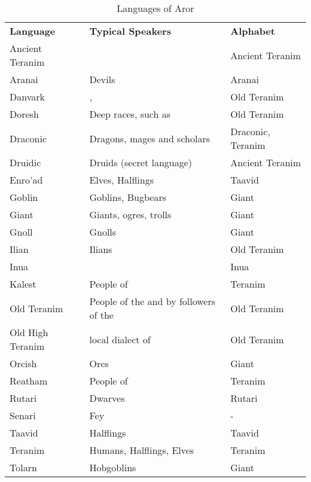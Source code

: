 \begin{table*}[!htb]
  \small
  \caption{Languages of Aror} \label{tbl:Languages}
  \begin{tabular}{l p{8cm} l}
    \textbf{Language} & \textbf{Typical Speakers} & \textbf{Alphabet} \\
    Ancient Teranim & \nameref{sec:Tynrikke}      & Ancient Teranim \\
    Aranai          & Devils                      & Aranai \\
    Danvark         & \nameref{sec:Morkan}, \nameref{sec:Norbury} & Old Teranim \\
    Doresh          & Deep races, such as \nameref{sec:Deepkin} & Old Teranim \\
    Draconic        & Dragons, mages and scholars & Draconic, Teranim \\
    Druidic         & Druids (secret language)    & Ancient Teranim \\
    Enro'ad         & Elves, Halflings            & Taavid \\
    Goblin          & Goblins, Bugbears           & Giant \\
    Giant           & Giants, ogres, trolls       & Giant \\
    Gnoll           & Gnolls                      & Giant \\
    Ilian           & Ilians                      & Old Teranim \\
    Inua            & \nameref{sec:Inua}          & Inua \\
    Kalest          & People of \nameref{sec:Arania} & Teranim \\
    Old Teranim     & People of the \nameref{sec:Dirgewood} and by followers of the \nameref{sec:Old Ways} & Old Teranim \\
    Old High Teranim& local dialect of\nameref{sec:Tredegar} & Old Teranim \\
    Orcish          & Orcs                        & Giant \\
    Reatham         & People of \nameref{sec:Forsby} & Teranim \\
    Rutari          & Dwarves                     & Rutari \\
    Senari          & Fey                         & - \\
    Taavid          & Halflings                   & Taavid \\
    Teranim         & Humans, Halflings, Elves    & Teranim \\
    Tolarn          & Hobgoblins                  & Giant \\
  \end{tabular}
\end{table*}

